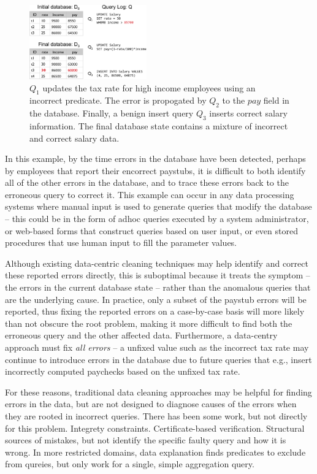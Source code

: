 \begin{figure}[t]
    \centering
        \includegraphics[width=0.45\textwidth]{figures/example}
    \caption{$Q_1$ updates the tax rate for high income employees using an incorrect predicate.  
      The error is propogated by $Q_2$ to the $pay$ field in the database.
      Finally, a benign insert query $Q_3$ inserts correct salary information. 
      The final database state contains a mixture of incorrect and correct salary data.
    }
    \label{fig:example}
\end{figure}


In this example, by the time errors in the database have been detected, 
perhaps by employees that report their encorrect paystubs, it is difficult 
to both identify all of the other errors in the database, and to trace these errors back to the erroneous query to correct it.
This example can occur in any data processing systems where manual input is used to generate queries that modify the database --
this could be in the form of adhoc queries executed by a system administrator, or web-based forms that construct queries based
on user input, or even stored procedures that use human input to fill the parameter values.

Although existing data-centric cleaning techniques may help identify and correct these reported errors directly, 
this is suboptimal because it treats the symptom -- the errors in the current database state -- rather than the anomalous
queries that are the underlying cause.  In practice, only a subset of the paystub errors will be reported, thus fixing
the reported errors on a case-by-case basis will more likely than not obscure the root problem, making it more difficult to
find both the erroneous query and the other affected data.  
Furthermore, a data-centry approach must fix {\it all errors} -- a unfixed value such as the incorrect tax rate
may continue to introduce errors in the database due to future queries that 
e.g., insert incorrectly computed paychecks based on the unfixed tax rate.

For these reasons, traditional data cleaning approaches may be helpful for finding errors in the data, but are
not designed to diagnose causes of the errors when they are rooted in incorrect queries.
There has been some work, but not directly for this problem.  
Integrety constraints.
Certificate-based verification.
Structural sources of mistakes, but not identify the specific faulty query and how it is wrong.
In more restricted domains, data explanation finds predicates to exclude from qureies, but only work for a single, simple  aggregation query.

